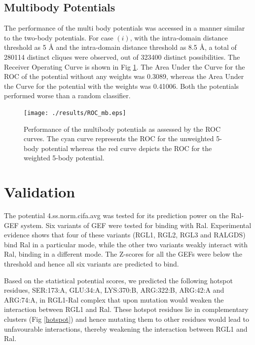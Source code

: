 \subsection{Multibody Potentials}
The performance of the multi body potentials was accessed in a manner similar to the two-body potentials. For case $(i)$, with the intra-domain distance threshold as 5 \AA \; and the intra-domain distance threshold as 8.5 \AA, \; a total of 280114 distinct cliques were observed, out of 323400 distinct possibilities. The Receiver Operating Curve is shown in Fig \ref{ROC_mb}. The Area Under the Curve for the ROC of the potential without any weights was 0.3089, whereas the Area Under the Curve for the potential with the weights was 0.41006. Both the potentials performed worse than a random classifier. \\[36pt]

\begin{figure}[H]
	\centering
	\texttt{[image: ./results/ROC\_mb.eps]}
	\caption[ROC curves for multi-body potentials]{Performance of the multibody potentials as assessed by the ROC curves. The cyan curve represents the ROC for the unweighted 5-body potential whereas the red curve depicts the ROC for the weighted 5-body potential.}
	\label{ROC_mb}
\end{figure}

\section{Validation}
The potential 4.ss.norm.cifa.avg was tested for its prediction power on the Ral-GEF system. Six variants of GEF were tested for binding with Ral. Experimental evidence shows that four of these variants (RGL1, RGL2, RGL3 and RALGDS) bind Ral in a particular mode, while the other two variants weakly interact with Ral, binding in a different mode. The Z-scores for all the GEFs were below the threshold and hence all six variants are predicted to bind.
\par
Based on the statistical potential scores, we predicted the following hotspot residues, SER:173:A, GLU:34:A, LYS:370:B, ARG:322:B, ARG:42:A and ARG:74:A, in RGL1-Ral complex that upon mutation would weaken the interaction between RGL1 and Ral. These hotspot residues lie in complementary clusters (Fig \ref{hotspot}) and hence mutating them to other residues would lead to unfavourable interactions, thereby weakening the interaction between RGL1 and Ral. \\ [48pt]

